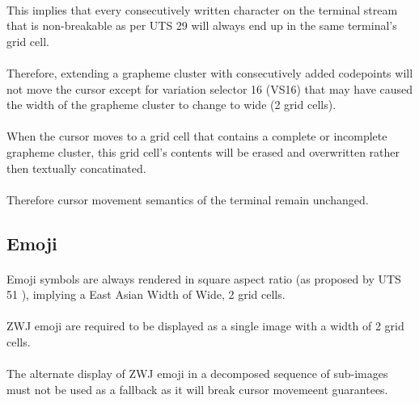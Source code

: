 \documentclass{article}
\begin{document}
\paragraph*{}
This implies that every consecutively written character on the terminal
stream that is non-breakable as per UTS 29 \cite{UTS-29} will
always end up in the same terminal's grid cell.

\paragraph*{}
Therefore, extending a grapheme cluster with consecutively added codepoints
will not move the cursor except for variation selector 16 (VS16) that may
have caused the width of the grapheme cluster to change to wide (2 grid cells).

\paragraph*{}
When the cursor moves to a grid cell that contains a complete or incomplete
grapheme cluster, this grid cell's contents will be erased and overwritten
rather then textually concatinated.

\paragraph*{}
Therefore cursor movement semantics of the terminal remain unchanged.

\subsection{Emoji}

\paragraph*{}
Emoji symbols are always rendered in square aspect ratio
(as proposed by UTS 51 \cite{UTS-51}),
implying a East Asian Width of Wide, 2 grid cells.

\paragraph*{}
ZWJ emoji are required to be displayed as a single image with a width of 2
grid cells.

\paragraph*{}
The alternate display of ZWJ emoji in a decomposed sequence of sub-images
must not be used as a fallback as it will break cursor movemeent guarantees.
\end{document}
